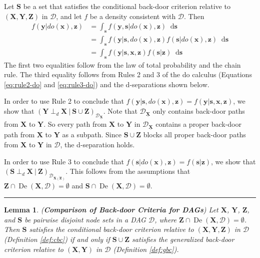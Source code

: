 \documentclass[twoside]{article}
\newtheorem{lemma}[theorem]{Lemma}
\DeclareMathOperator{\De}{De}
\newcommand\given[1][]{\:#1\vert\:}
\newcommand{\mb}[1]{\mathbf{#1}}
\newcommand{\dsepp}{\perp_{d}}
\newcommand{\g}[1][G]{\mathcal{#1}}
\newcommand*\diff{\mathop{}\!\mathrm{d}}
\newenvironment{proofof}[1][]{\begin{trivlist}
\item[\hskip \labelsep {\bfseries Proof of #1.}]}{\hfill\BlackBox\end{trivlist}}
\newcommand{\BlackBox}{\rule{1.5ex}{1.5ex}}
\begin{document}
\begin{proofof}[Lemma \ref{lem:cbc-cas}]
    Let $\mb{S}$ be a set that satisfies the conditional back-door criterion relative to $(\mb{X},\mb{Y},\mb{Z})$ in $\g[D]$, and let $f$ be a density consistent with $\g[D]$. Then
    \begin{align}
        f(\mb{y}|do(\mb{x}),\mb{z}) &= \int_\mb{s} f(\mb{y},\mb{s}|do(\mb{x}),\mb{z}) \diff \mb{s} \nonumber \\
                     &= \int_\mb{s} f(\mb{y}|\mb{s},do(\mb{x}),\mb{z}) f(\mb{s}|do(\mb{x}),\mb{z}) \diff \mb{s} \nonumber \\
                     &= \int_\mb{s} f(\mb{y}|\mb{s},\mb{x},\mb{z}) f(\mb{s}|\mb{z}) \diff \mb{s} \nonumber
    \end{align}
    The first two equalities follow from the law of total probability and the chain rule. The third equality follows from Rules 2 and 3 of the do calculus (Equations \eqref{eq:rule2-do} and \eqref{eq:rule3-do}) and the d-separations shown below. 

    In order to use Rule 2 to conclude that $f(\mb{y}|\mb{s},do(\mb{x}),\mb{z})=f(\mb{y}|\mb{s},\mb{x},\mb{z})$, we show that $(\mb{Y} \dsepp \mb{X} \given \mb{S} \cup \mb{Z})_{\g[D]_{\underline{\mb{X}}}}$. Note that $\g[D]_{\underline{\mb{X}}}$ only contains back-door paths from $\mb{X}$ to $\mb{Y}$. So every path from $\mb{X}$ to $\mb{Y}$ in $\g[D]_{\underline{\mb{X}}}$ contains a proper back-door path from $\mb{X}$ to $\mb{Y}$ as a subpath. Since $\mb{S} \cup \mb{Z}$ blocks all proper back-door paths from $\mb{X}$ to $\mb{Y}$ in $\g[D]$, the d-separation holds. 

    In order to use Rule 3 to conclude that $f(\mb{s}|do(\mb{x}),\mb{z}) = f(\mb{s}|\mb{z})$, we show that $(\mb{S} \dsepp \mb{X} \given \mb{Z})_{\g[D]_{\overline{\mb{X}(\mb{Z})}}}$. This follows from the assumptions that $\mb{Z} \cap \De(\mb{X},\g[D]) = \emptyset$ and $\mb{S} \cap \De(\mb{X},\g[D]) = \emptyset$.
\end{proofof}




\begin{lemma}
\label{lem:gbc-cbc}
{\normalfont (\textbf{Comparison of Back-door Criteria for DAGs})}
    Let $\mb{X}$, $\mb{Y}$, $\mb{Z}$, and $\mb{S}$ be pairwise disjoint node sets in a DAG $\g[D]$, where $\mb{Z} \cap \De(\mb{X}, \g[D]) = \emptyset$. Then $\mb{S}$ satisfies the conditional back-door criterion relative to $(\mb{X,Y,Z})$ in $\g[D]$ (Definition \ref{def:cbc}) if and only if $\mb{S} \cup \mb{Z}$ satisfies the generalized back-door criterion relative to $(\mb{X}, \mb{Y})$ in $\g[D]$ (Definition \ref{def:gbc}).
\end{lemma}
\end{document}
